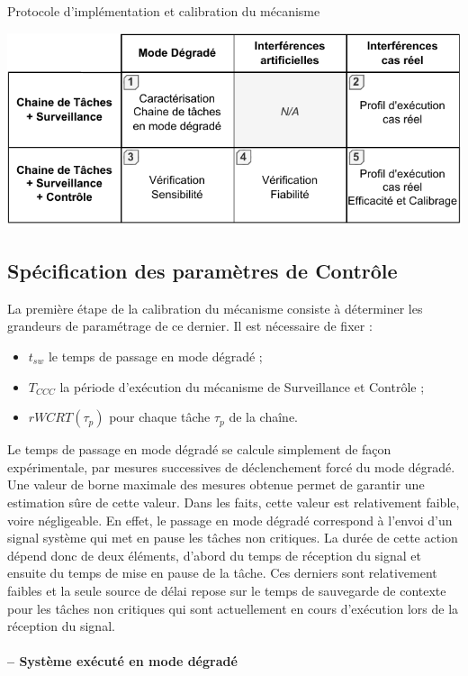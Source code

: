 \documentclass[french, a4paper, 11pt, twoside, pdftex]{StyleThese}
\begin{document}
		
		\begin{table}[ht]
			\centering
			\caption{Protocole d'implémentation et calibration du mécanisme}
			\label{tab:tableprotocoleImplementation}
			\includegraphics[width=0.8\linewidth]{tables/Table_Protocole_Implem}
		\end{table}
	
            
    \subsection{Spécification des paramètres de Contrôle}
    	La première étape de la calibration du mécanisme consiste à déterminer les grandeurs de paramétrage de ce dernier. Il est nécessaire de fixer : 
    	\begin{itemize}
    		\item $t_{sw}$ le temps de passage en mode dégradé ;
    		\item $T_{CCC}$ la période d'exécution du mécanisme de Surveillance et Contrôle ;
    		\item $rWCRT(\tau_{p})$ pour chaque tâche $\tau_p$ de la chaîne.
    	\end{itemize}
    
    	Le temps de passage en mode dégradé se calcule simplement de façon expérimentale, par mesures successives de déclenchement forcé du mode dégradé. Une valeur de borne maximale des mesures obtenue permet de garantir une estimation sûre de cette valeur. Dans les faits, cette valeur est relativement faible, voire négligeable. En effet, le passage en mode dégradé correspond à l'envoi d'un signal système qui met en pause les tâches non critiques. La durée de cette action dépend donc de deux éléments, d'abord du temps de réception du signal et ensuite du temps de mise en pause de la tâche. Ces derniers sont relativement faibles et la seule source de délai repose sur le temps de sauvegarde de contexte pour les tâches non critiques qui sont actuellement en cours d'exécution lors de la réception du signal.
    
    	\paragraph{ -- Système exécuté en mode dégradé}
    	
\end{document}
